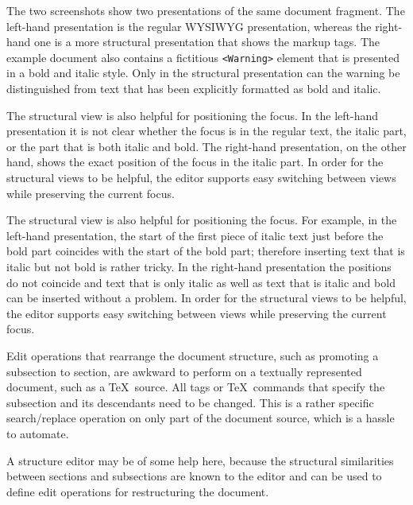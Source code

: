 \documentclass{entcs}
\begin{document}
The two screenshots show two presentations of the same document fragment. The left-hand presentation is the regular WYSIWYG presentation, whereas the right-hand one is a more structural presentation that shows the markup tags. The example document also contains a fictitious \verb|<Warning>| element that is presented in a bold and italic style. Only in the structural presentation can the warning be distinguished from text that has been explicitly formatted as bold and italic.

The structural view is also helpful for positioning the focus. In the left-hand presentation it is not clear whether the focus is in the regular text, the italic part, or the part that is both italic and bold. The right-hand presentation, on the other hand, shows the exact position of the focus in the italic part. In order for the structural views to be helpful, the editor supports easy switching between views while preserving the current focus.

\bc
The structural view is also helpful for positioning the focus. For example, in the left-hand presentation, the start of the first piece of italic text just before the bold part coincides with the start of the bold part; therefore inserting text that is italic but not bold is rather tricky. In the right-hand presentation the positions do not coincide and text that is only italic as well as text that is italic and bold can be inserted without a problem. In order for the structural views to be helpful, the editor supports easy switching between views while preserving the current focus.
\ec



Edit operations that rearrange the document structure, such as promoting a subsection to section, are awkward to perform on a textually represented document, such as a \TeX\ source. All tags or \TeX\ commands that specify the subsection and its descendants need to be changed. This is a rather specific search/replace operation on only part of the document source, which is a hassle to automate.

A structure editor may be of some help here, because the structural similarities between sections and subsections are known to the editor and can be used to define edit operations for restructuring the document.
\end{document}
